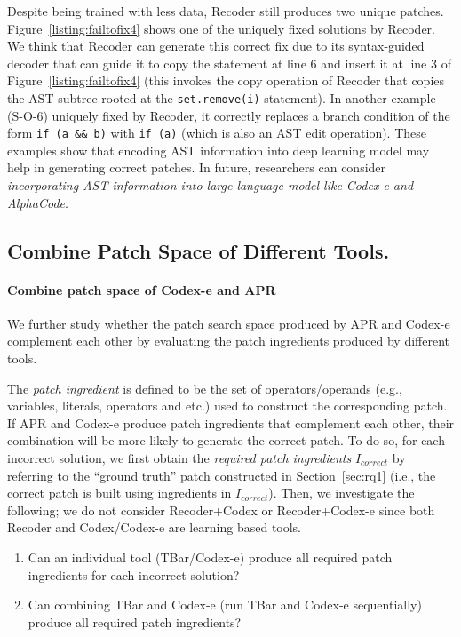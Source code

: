 Despite being trained with less data, Recoder still produces two unique patches. Figure~\ref{listing:failtofix4} shows one of the uniquely fixed solutions by Recoder. We think that Recoder can generate this correct fix due to its syntax-guided decoder that can guide it to copy the statement at line 6 and insert it at line 3 of Figure~\ref{listing:failtofix4} (this invokes the copy operation of Recoder that copies the AST subtree rooted at the \texttt{set.remove(i)} statement). In another example (S-O-6) uniquely fixed by Recoder, it correctly replaces a branch condition of the form \texttt{if (a \&\& b)} with \texttt{if (a)} (which is also an AST edit operation). These examples show that encoding AST information into deep learning model may help in generating correct patches. In future, researchers can consider {\em incorporating AST information into large language model like Codex-e and AlphaCode}. 

\subsection{Combine Patch Space of Different Tools.}
\label{subsec:combineapr}

\paragraph{\textbf{Combine patch space of Codex-e and APR}} We further study whether the patch search space produced by APR and Codex-e complement each other by evaluating the patch ingredients produced by different tools.

The \emph{patch ingredient} is defined to be the set of operators/operands (e.g., variables, literals, operators and etc.) used to construct the corresponding patch. If APR and Codex-e produce patch ingredients that complement each other, their combination will be more likely to generate the correct patch. To do so, for each incorrect solution, we first obtain the \emph{required patch ingredients} $I_{correct}$ by referring to the ``ground truth'' patch constructed in Section~\ref{sec:rq1} (i.e., the correct patch is built using ingredients in $I_{correct}$). Then, we investigate the following; we do not consider Recoder+Codex or Recoder+Codex-e since both Recoder and Codex/Codex-e are learning based tools.

\begin{enumerate}[leftmargin=*]
\item Can an individual tool (TBar/Codex-e) produce all required patch ingredients for each incorrect solution?
\item Can combining TBar and Codex-e (run TBar and Codex-e sequentially) produce all required patch ingredients?

\end{enumerate}

